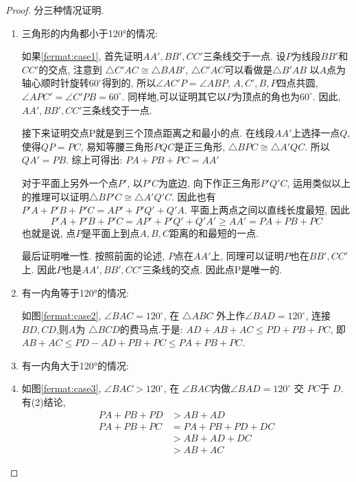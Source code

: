 \begin{proof}
  分三种情况证明.
\begin{enumerate}
  \item 三角形的内角都小于120°的情况:
  
  如果\ref{fermat:case1}, 首先证明$AA',BB',CC'$三条线交于一点.
  设$P$为线段$BB'$和$CC'$的交点,
  注意到 $\triangle C'AC \cong \triangle BAB'$, 
  $\triangle C'AC$可以看做是$\triangle B'AB$ 
  以$A$点为轴心顺时针旋转$60^\circ$得到的,
  所以$\angle AC'P = \angle ABP$, $A,C',B,P$四点共圆, 
  $\angle APC' = \angle C'PB = 60^\circ$.
  同样地,可以证明其它以$P$为顶点的角也为$60^\circ$. 
  因此, $AA',BB',CC'$三条线交于一点.
  
  接下来证明交点P就是到三个顶点距离之和最小的点.
  在线段$AA'$上选择一点$Q$,
  使得$QP = PC$,
  易知等腰三角形$PQC$是正三角形,
  $\triangle BPC \cong \triangle A'QC$.
  所以$QA' = PB$.
  综上可得出: $PA + PB + PC = AA'$

  对于平面上另外一个点$P'$,
  以$P'C$为底边,
  向下作正三角形$P'Q'C$,
  运用类似以上的推理可以证明$\triangle BP'C \cong \triangle A'Q'C$.
  因此也有 $P'A + P'B + P'C = AP' + P'Q' + Q'A$.
  平面上两点之间以直线长度最短, 因此
  \[P'A + P'B + P'C = AP' + P'Q' + Q'A' ≥ AA' = PA + PB + PC\]
  也就是说, 点$P$是平面上到点$A,B,C$距离的和最短的一点.
  
  最后证明唯一性. 按照前面的论述, $P$点在$AA'$上,
  同理可以证明$P$也在$BB',CC'$上.
  因此$P$也是$AA',BB',CC'$三条线的交点.
  因此点P是唯一的.
  
  \item 有一内角等于120°的情况:
  
  如图\ref{fermat:case2}, $\angle BAC = 120^\circ$,
  在 $\triangle ABC$ 外上作$\angle BAD = 120^\circ$,
  连接$BD,CD$,则$A$为 $\triangle BCD$的费马点.于是:
  $AD+AB+AC \leqslant PD+PB+PC$, 即$AB+AC \leqslant PD-AD+PB+PC \leqslant PA+PB+PC $. 
  
  \item 有一内角大于120°的情况:
  \item 
  如图\ref{fermat:case3}, $\angle BAC > 120^\circ$, 在 $\angle BAC$内做$\angle BAD = 120^\circ$ 交 $PC$于 $D$.
  有(2)结论, 
  \begin{align*}
    PA+PB+PD &> AB + AD \\
    PA+PB+PC &= PA+PB+PD+DC \\
             &> AB + AD + DC \\
             &> AB + AC
  \end{align*}
\end{enumerate}
\end{proof}

